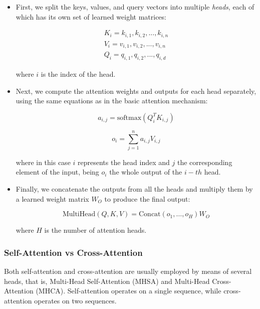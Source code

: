\begin{itemize}
	\item First, we split the keys, values, and query vectors into multiple \textit{heads}, each of which has its own set of learned weight matrices:
	
	\begin{equation}
		\begin{split}
			K_i = {k_{i,1}, k_{i,2}, ..., k_{i,n}} \\
			V_i = {v_{i,1}, v_{i,2}, ..., v_{i,n}} \\
			Q_i = {q_{i,1}, q_{i,2}, ..., q_{i,d}}
		\end{split}
	\end{equation}
	
	where $i$ is the index of the head. 
	
	\item Next, we compute the attention weights and outputs for each head separately, using the same equations as in the basic attention mechanism:
	
	\begin{equation}
		a_{i,j} = \text{softmax}(Q_i^T K_{i,j})
	\end{equation}
	
	\begin{equation}
		o_{i} = \sum_{j=1}^{n} a_{i,j} V_{i,j}
	\end{equation}

	where in this case $i$ represents the head index and $j$ the corresponding element of the input, being $o_{i}$ the whole output of the $i-th$ head.
	
	\item Finally, we concatenate the outputs from all the heads and multiply them by a learned weight matrix $W_{O}$ to produce the final output:
	
	\begin{equation}
		\text{MultiHead}(Q, K, V) = \text{Concat}(o_{1}, \dots, o_{H})W_{O}
	\end{equation}
	
	where $H$ is the number of attention heads.
\end{itemize}

\subsubsection{Self-Attention vs Cross-Attention}
\label{subsubsec:3_self_attention_vs_cross_attention}

Both self-attention and cross-attention are usually employed by means of several heads, that is, Multi-Head Self-Attention (MHSA) and Multi-Head Cross-Attention (MHCA). Self-attention operates on a single sequence, while cross-attention operates on two sequences. 

